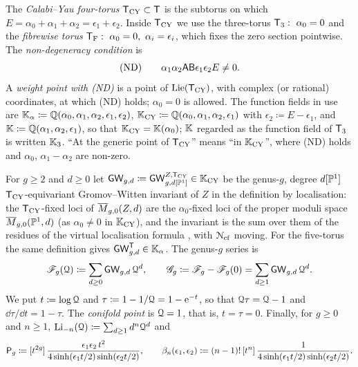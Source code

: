 \begin{defn}
\label{def:set-ND}
The \emph{Calabi--Yau four-torus} $\mathsf{T}_{\mathrm{CY}}\subset\mathsf{T}$ is the subtorus on which $E=\alpha_0+\alpha_1+\alpha_2=\epsilon_1+\epsilon_2$. Inside $\mathsf{T}_{\mathrm{CY}}$ we use the three-torus $\mathsf{T}_{3}:\ \alpha_0=0$ and the \emph{fibrewise torus} $\TF:\ \alpha_0=0,\ \alpha_i=\epsilon_i$, which fixes the zero section pointwise. The \emph{non-degeneracy condition} is
\[
\text{(ND)}\qquad \alpha_1\alpha_2\mathsf{A}\mathsf{B}\epsilon_1\epsilon_2E\neq0 .
\]
A \emph{weight point with (ND)} is a point of $\mathrm{Lie}(\mathsf{T}_{\mathrm{CY}})$, with complex (or rational) coordinates, at which (ND) holds; $\alpha_0=0$ is allowed. The function fields in use are $\mathbb{K}_{\alpha}\coloneqq\mathbb{Q}(\alpha_0,\alpha_1,\alpha_2,\epsilon_1,\epsilon_2)$, $\mathbb{K}_{\mathrm{CY}}\coloneqq\mathbb{Q}(\alpha_0,\alpha_1,\alpha_2,\epsilon_1)$ with $\epsilon_2\coloneqq E-\epsilon_1$, and $\mathbb{K}\coloneqq\mathbb{Q}(\alpha_1,\alpha_2,\epsilon_1)$, so that $\mathbb{K}_{\mathrm{CY}}=\mathbb{K}(\alpha_0)$; $\mathbb{K}$ regarded as the function field of $\mathsf{T}_{3}$ is written $\mathbb{K}_{3}$. ``At the generic point of $\mathsf{T}_{\mathrm{CY}}$'' means ``in $\mathbb{K}_{\mathrm{CY}}$'', where (ND) holds and $\alpha_0$, $\alpha_1-\alpha_2$ are non-zero.
\end{defn}

\begin{defn}
\label{def:set-inv}
For $g\geq2$ and $d\geq0$ let $\mathsf{GW}_{g,d}\coloneqq\mathsf{GW}^{Z,\mathsf{T}_{\mathrm{CY}}}_{g,d[\mathbb{P}^1]}\in\mathbb{K}_{\mathrm{CY}}$ be the genus-$g$, degree $d[\mathbb{P}^1]$ $\mathsf{T}_{\mathrm{CY}}$-equivariant Gromov--Witten invariant of $Z$ in the definition by localisation: the $\mathsf{T}_{\mathrm{CY}}$-fixed loci of $\overline{M}_{g,0}(Z,d)$ are the $\alpha_0$-fixed loci of the proper moduli space $\overline{M}_{g,0}(\mathbb{P}^1,d)$ (as $\alpha_0\neq0$ in $\mathbb{K}_{\mathrm{CY}}$), and the invariant is the sum over them of the residues of the virtual localisation formula \cite{GP99}, with $\mathcal{N}_{\mathrm{cf}}$ moving. For the five-torus the same definition gives $\mathsf{GW}^{\mathsf{T}}_{g,d}\in\mathbb{K}_{\alpha}$. The genus-$g$ series is
\[
\mathscr{F}_g(\mathcal{Q})\coloneqq\sum_{d\geq0}\mathsf{GW}_{g,d}\,\mathcal{Q}^d,\qquad \mathscr{G}_g\coloneqq\mathscr{F}_g-\mathscr{F}_g(0)=\sum_{d\geq1}\mathsf{GW}_{g,d}\,\mathcal{Q}^d .
\]
We put $t\coloneqq\log\mathcal{Q}$ and $\tau\coloneqq1-1/\mathcal{Q}=1-\mathrm{e}^{-t}$, so that $\mathcal{Q}\tau=\mathcal{Q}-1$ and $\dd\tau/\dd t=1-\tau$. The \emph{conifold point} is $\mathcal{Q}=1$, that is, $t=\tau=0$. Finally, for $g\geq0$ and $n\geq1$,
$\operatorname{Li}_{-n}(\mathcal{Q})\coloneqq\sum_{d\geq1}d^n\mathcal{Q}^d$ and
\[
\mathsf{P}_{g}\coloneqq[t^{2g}]\,\frac{\epsilon_1\epsilon_2\,t^2}{4\sinh(\epsilon_1t/2)\sinh(\epsilon_2t/2)},\qquad
\beta_n(\epsilon_1,\epsilon_2)\coloneqq(n-1)!\,[t^n]\,\frac{1}{4\sinh(\epsilon_1t/2)\sinh(\epsilon_2t/2)} .
\]
\end{defn}

